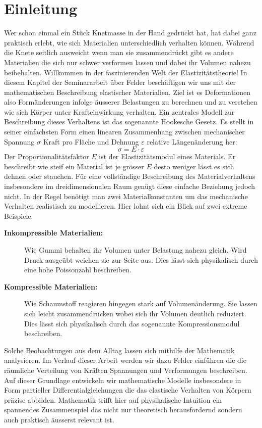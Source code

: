 %
%
%
%
\section{Einleitung}
\label{elastomechanik:section:Einleitung}
Wer schon einmal ein Stück Knetmasse in der Hand gedrückt hat, hat dabei ganz praktisch erlebt, wie sich Materialien unterschiedlich verhalten können. 
Während die Knete seitlich ausweicht wenn man sie zusammendrückt gibt es andere Materialien die sich nur schwer verformen lassen und dabei ihr Volumen nahezu beibehalten. 
Willkommen in der faszinierenden Welt der Elastizitätstheorie!
In diesem Kapitel der Seminararbeit über Felder beschäftigen wir uns mit der mathematischen Beschreibung elastischer Materialien.
Ziel ist es Deformationen also Formänderungen infolge äusserer Belastungen zu berechnen und zu verstehen wie sich Körper unter Krafteinwirkung verhalten.
Ein zentrales Modell zur Beschreibung dieses Verhaltens ist das sogenannte Hookesche Gesetz.
Es stellt in seiner einfachsten Form einen linearen Zusammenhang zwischen mechanischer Spannung $\sigma$ Kraft pro Fläche und Dehnung $\varepsilon$ relative Längenänderung her:
	\begin{equation}
		\sigma = 
		E \cdot \varepsilon
	\end{equation}
Der Proportionalitätsfaktor $E$ ist der Elastizitätsmodul eines Materials.
Er beschreibt wie steif ein Material ist je grösser $E$ desto weniger lässt es sich dehnen oder stauchen.
Für eine vollständige Beschreibung des Materialverhaltens insbesondere im dreidimensionalen Raum genügt diese einfache Beziehung jedoch nicht.
In der Regel benötigt man zwei Materialkonstanten um das mechanische Verhalten realistisch zu modellieren.
Hier lohnt sich ein Blick auf zwei extreme Beispiele:
\begin{description}
\item[\textbf{Inkompressible Materialien:}] Wie Gummi behalten ihr Volumen unter Belastung nahezu gleich.
Wird Druck ausgeübt weichen sie zur Seite aus.
Dies lässt sich physikalisch durch eine hohe Poissonzahl beschreiben.
\item[\textbf{Kompressible Materialien:}]  Wie Schaumstoff reagieren hingegen stark auf Volumenänderung.
Sie lassen sich leicht zusammendrücken wobei sich ihr Volumen deutlich reduziert.
Dies lässt sich physikalisch durch das sogenannte Kompressionsmodul beschreiben.
\end{description}

Solche Beobachtungen aus dem Alltag lassen sich mithilfe der Mathematik analysieren.
Im Verlauf dieser Arbeit werden wir dazu Felder einführen die die räumliche Verteilung von Kräften Spannungen und Verformungen beschreiben.
Auf dieser Grundlage entwickeln wir mathematische Modelle insbesondere in Form partieller Differentialgleichungen die das elastische Verhalten von Körpern präzise abbilden.
Mathematik trifft hier auf physikalische Intuition ein spannendes Zusammenspiel das nicht nur theoretisch herausfordernd sondern auch praktisch äusserst relevant ist.


